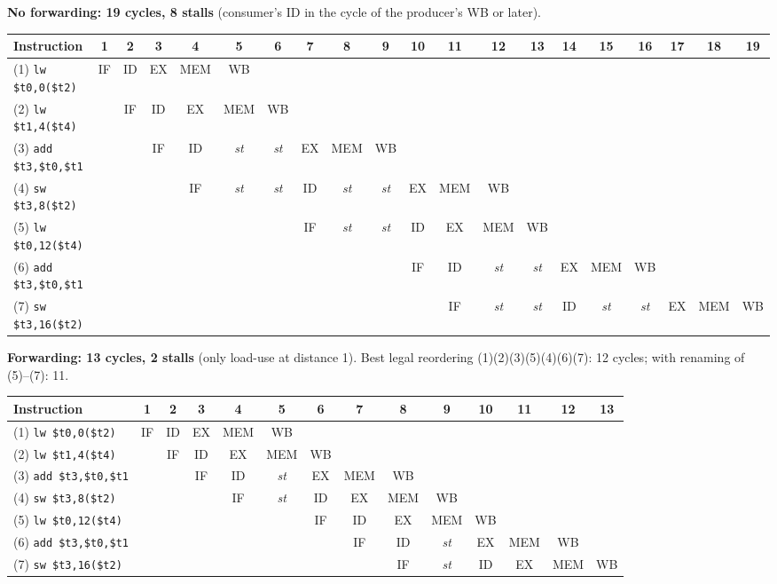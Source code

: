 \documentclass[10pt]{extarticle}
\begin{document}
\noindent\textbf{No forwarding: 19 cycles, 8 stalls} (consumer's ID in the cycle of the producer's WB or later).
\begin{center}\footnotesize\setlength{\tabcolsep}{2.4pt}
\begin{tabular}{@{}lccccccccccccccccccc@{}}
\toprule
Instruction & 1 & 2 & 3 & 4 & 5 & 6 & 7 & 8 & 9 & 10 & 11 & 12 & 13 & 14 & 15 & 16 & 17 & 18 & 19 \\
\midrule
(1) \texttt{lw \$t0,0(\$t2)} & IF & ID & EX & MEM & WB &  &  &  &  &  &  &  &  &  &  &  &  &  &  \\
(2) \texttt{lw \$t1,4(\$t4)} &  & IF & ID & EX & MEM & WB &  &  &  &  &  &  &  &  &  &  &  &  &  \\
(3) \texttt{add \$t3,\$t0,\$t1} &  &  & IF & ID & \textit{st} & \textit{st} & EX & MEM & WB &  &  &  &  &  &  &  &  &  &  \\
(4) \texttt{sw \$t3,8(\$t2)} &  &  &  & IF & \textit{st} & \textit{st} & ID & \textit{st} & \textit{st} & EX & MEM & WB &  &  &  &  &  &  &  \\
(5) \texttt{lw \$t0,12(\$t4)} &  &  &  &  &  &  & IF & \textit{st} & \textit{st} & ID & EX & MEM & WB &  &  &  &  &  &  \\
(6) \texttt{add \$t3,\$t0,\$t1} &  &  &  &  &  &  &  &  &  & IF & ID & \textit{st} & \textit{st} & EX & MEM & WB &  &  &  \\
(7) \texttt{sw \$t3,16(\$t2)} &  &  &  &  &  &  &  &  &  &  & IF & \textit{st} & \textit{st} & ID & \textit{st} & \textit{st} & EX & MEM & WB \\
\bottomrule
\end{tabular}
\end{center}
\noindent\textbf{Forwarding: 13 cycles, 2 stalls} (only load-use at distance 1). Best legal reordering (1)(2)(3)(5)(4)(6)(7): 12 cycles; with renaming of (5)--(7): 11.
\begin{center}\footnotesize\setlength{\tabcolsep}{2.4pt}
\begin{tabular}{@{}lccccccccccccc@{}}
\toprule
Instruction & 1 & 2 & 3 & 4 & 5 & 6 & 7 & 8 & 9 & 10 & 11 & 12 & 13 \\
\midrule
(1) \texttt{lw \$t0,0(\$t2)} & IF & ID & EX & MEM & WB &  &  &  &  &  &  &  &  \\
(2) \texttt{lw \$t1,4(\$t4)} &  & IF & ID & EX & MEM & WB &  &  &  &  &  &  &  \\
(3) \texttt{add \$t3,\$t0,\$t1} &  &  & IF & ID & \textit{st} & EX & MEM & WB &  &  &  &  &  \\
(4) \texttt{sw \$t3,8(\$t2)} &  &  &  & IF & \textit{st} & ID & EX & MEM & WB &  &  &  &  \\
(5) \texttt{lw \$t0,12(\$t4)} &  &  &  &  &  & IF & ID & EX & MEM & WB &  &  &  \\
(6) \texttt{add \$t3,\$t0,\$t1} &  &  &  &  &  &  & IF & ID & \textit{st} & EX & MEM & WB &  \\
(7) \texttt{sw \$t3,16(\$t2)} &  &  &  &  &  &  &  & IF & \textit{st} & ID & EX & MEM & WB \\
\bottomrule
\end{tabular}
\end{center}
\end{document}
